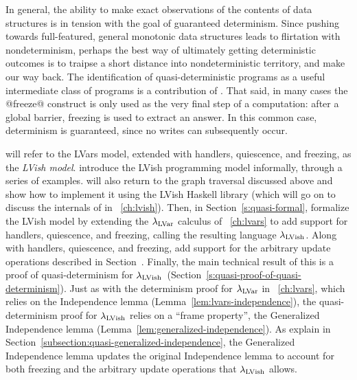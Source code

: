 In general, the ability to make exact observations of the contents of
data structures is in tension with the goal of guaranteed determinism.
Since pushing towards full-featured, general monotonic data structures
leads to flirtation with nondeterminism, perhaps the best way of
ultimately getting deterministic outcomes is to traipse a short
distance into nondeterministic territory, and make our way back.  The
identification of quasi-deterministic programs as a useful
intermediate class of programs is a contribution of .
That said, in many cases the @freeze@ construct is only used as the
very final step of a computation: after a global barrier, freezing is
used to extract an answer.  In this common case, determinism is
guaranteed, since no writes can subsequently occur.

\ifdefined\DISSERTATION
{} will refer to the LVars model, extended with handlers, quiescence,
and freezing, as the \emph{LVish model}.   introduce
the LVish programming model informally, through a series of examples.
 will also return to the graph traversal  discussed above and show
how to implement it using the LVish Haskell library (which  will go
on to discuss the internals of in ~\ref{ch:lvish}).  Then, in
Section~\ref{s:quasi-formal},  formalize the LVish model by extending
the $\lambda_{\textrm{LVar}}$ calculus of ~\ref{ch:lvars} to add support
for handlers, quiescence, and freezing, calling the resulting language
$\lambda_{\textrm{LVish}}$.  Along with handlers, quiescence, and freezing,  add
support for the arbitrary update operations described in
Section~\either{\ref{subsection:lvars-generalizing-from-least-upper-bound-writes}}{\ref{s:lvars-generalizing}}.
Finally, the main technical result of this  is a proof of
quasi-determinism for
$\lambda_{\textrm{LVish}}$~(Section~\ref{s:quasi-proof-of-quasi-determinism}). Just
as with the determinism proof  for $\lambda_{\textrm{LVar}}$ in
~\ref{ch:lvars}, which relies on the Independence lemma
(Lemma~\ref{lem:lvars-independence}), the quasi-determinism proof for
$\lambda_{\textrm{LVish}}$ relies on a ``frame property'', the Generalized
Independence lemma (Lemma~\ref{lem:generalized-independence}).  As 
explain in Section~\ref{subsection:quasi-generalized-independence},
the Generalized Independence lemma updates the original Independence
lemma to account for both freezing and the arbitrary update operations
that $\lambda_{\textrm{LVish}}$ allows.
\fi

